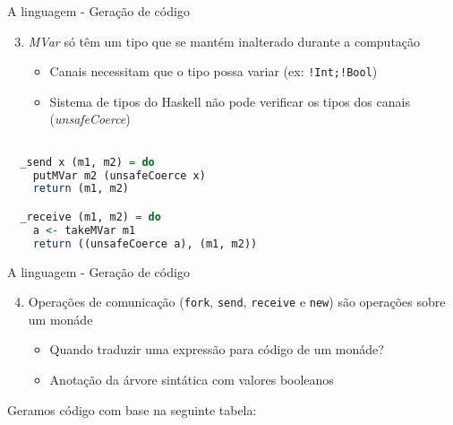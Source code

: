 \begin{frame}[fragile]{A linguagem - Geração de código}
  \begin{enumerate}
    \setcounter{enumi}{2}    
  \item \textit{MVar} só têm um tipo que se mantém inalterado durante a computação
    \begin{itemize}
    \item Canais necessitam que o tipo possa variar (ex: \lstinline|!Int;!Bool|)
    \item Sistema de tipos do Haskell não pode verificar os tipos dos canais (\textit{unsafeCoerce})
    \end{itemize}
  \end{enumerate}
  \begin{lstlisting}[language=Haskell]

  _send x (m1, m2) = do
    putMVar m2 (unsafeCoerce x)
    return (m1, m2)

  _receive (m1, m2) = do
    a <- takeMVar m1
    return ((unsafeCoerce a), (m1, m2))
\end{lstlisting}
\end{frame}

\begin{frame}[fragile]{A linguagem - Geração de código}
  \begin{enumerate}
    \setcounter{enumi}{3}  
  \item Operações de comunicação (\lstinline|fork|, \lstinline|send|, \lstinline|receive| e \lstinline|new|) são operações sobre um monáde
    \begin{itemize}
    \item Quando traduzir uma expressão para código de um monáde?
    \item Anotação da árvore sintática com valores booleanos
    \end{itemize}
  \end{enumerate}
  Geramos código com base na seguinte tabela:
  \vskip 0.2cm
\end{frame}

